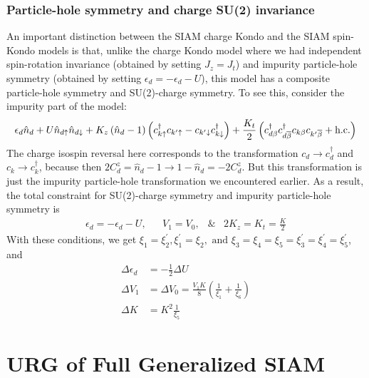 \documentclass[12pt,twoside]{report}
\numberwithin{equation}{section}
\begin{document}
\subsection{Particle-hole symmetry and charge SU(2) invariance}
An important distinction between the SIAM charge Kondo and the SIAM spin-Kondo models is that, unlike the charge Kondo model where we had independent spin-rotation invariance (obtained by setting \(J_z = J_t\)) and impurity particle-hole symmetry (obtained by setting \(\epsilon_d = -\epsilon_d - U\)), this model has a composite particle-hole symmetry and SU(2)-charge symmetry. To see this, consider the impurity part of the model:
\begin{equation}
	\epsilon_d \hat n_d + U \hat n_{d\uparrow}\hat n_{d\downarrow} + K_z \left(\hat n_d - 1\right)\left(c^\dagger_{k\uparrow}c_{k^\prime\uparrow} - c_{k^\prime\downarrow}c^\dagger_{k\downarrow}\right) + \frac{K_t}{2}\left(c^\dagger_{d\beta}c^\dagger_{d\overline\beta}c_{k\beta}c_{k^\prime\overline\beta} + \text{h.c.}\right)
\end{equation}
The charge isospin reversal here corresponds to the transformation \(c_d \to c^\dagger_d\) and \(c_k \to c^\dagger_k\), because then \(2C^z_d = \hat n_d - 1 \to 1 - \hat n_d = -2C^z_d\). But this transformation is just the impurity particle-hole transformation we encountered earlier. As a result, the total constraint for SU(2)-charge symmetry and impurity particle-hole symmetry is
\begin{equation}\begin{aligned}
	\label{symm-charge}
	\epsilon_d = -\epsilon_d - U, && V_1 = V_0, &\& & 2K_z = K_t = \frac{K}{2} 
\end{aligned}\end{equation}
With these conditions, we get \(\xi_1 = \xi_2^\prime, \xi_1^\prime = \xi_2, \text{ and }\xi_3 = \xi_4 = \xi_5 = \xi_3^\prime = \xi_4^\prime = \xi_5^\prime\), and
\begin{equation}\begin{aligned}
	\Delta \epsilon_d &= -\frac{1}{2}\Delta U\\
	\Delta V_1 &= \Delta V_0 = \frac{V_1 K}{8}\left( \frac{1}{\xi_1} + \frac{1}{\xi_6} \right)\\
	\Delta K &= K^2 \frac{1}{\xi_5}
\end{aligned}\end{equation}

\chapter{URG of Full Generalized SIAM}
\label{fullurg}
\end{document}
